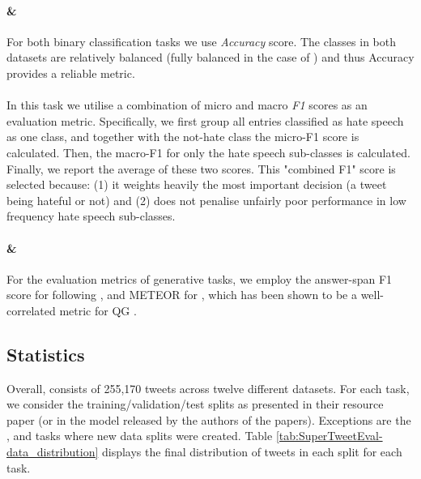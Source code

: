 \paragraph{{\TweetNERD} \& {\TempoWiC}} For both binary classification tasks we use \textit{Accuracy} score. The classes in both datasets are relatively balanced (fully balanced in the case of {\TweetNERD}) and thus Accuracy provides a reliable metric.

\paragraph{{\TweetHate}} In this task we utilise a combination of micro and macro \textit{F1} scores as an evaluation metric. Specifically, we first group all entries classified as hate speech as one class, and together with the not-hate class the micro-F1 score is calculated. Then, the macro-F1 for only the hate speech sub-classes is calculated. Finally, we report the average of these two scores. This "combined F1" score is selected because: (1) it weights heavily the most important decision (a tweet being hateful or not) and (2) does not penalise unfairly poor performance in low frequency hate speech sub-classes.

\paragraph{{\TweetQA} \& {\TweetQG}} For the evaluation metrics of generative tasks, we employ the answer-span F1 score for {\TweetQA} following , and METEOR \cite{denkowski-lavie-2014-meteor} for {\TweetQG}, which has been shown to be a well-correlated metric for QG \cite{ushio-etal-2022-generative}.


\subsection{Statistics}
\label{sec:statistics}
Overall, {\DATASET} consists of 255,170 tweets across twelve different datasets. For each task, we consider the training/validation/test splits as presented in their resource paper (or in the model released by the authors of the papers). Exceptions are the {\TweetHate}, {\TweetSimilarity} and {\TweetEmoji} tasks where new data splits were created. Table \ref{tab:SuperTweetEval-data_distribution} displays the final distribution of tweets in each split  for each task.


